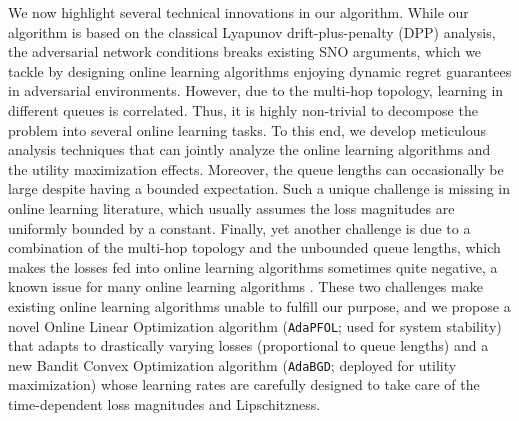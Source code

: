 \documentclass[11pt,fullpage,letterpaper]{article} %
\newcommand{\OLOAlg}{\texttt{AdaPFOL}\xspace}
\newcommand{\BCOAlg}{\texttt{AdaBGD}\xspace}
\begin{document}
We now highlight several technical innovations in our algorithm. While our algorithm is based on the classical Lyapunov drift-plus-penalty (DPP) analysis, the adversarial network conditions breaks existing SNO arguments, which we tackle by designing online learning algorithms enjoying dynamic regret guarantees in adversarial environments.
However, due to the multi-hop topology, learning in different queues is correlated. Thus, it is highly non-trivial to decompose the problem into several online learning tasks. To this end, we develop meticulous analysis techniques that can jointly analyze the online learning algorithms and the utility maximization effects.
Moreover, the queue lengths can occasionally be large despite having a bounded expectation. Such a unique challenge is missing in online learning literature, which usually assumes the loss magnitudes are uniformly bounded by a constant.
Finally, yet another challenge is due to a combination of the multi-hop topology and the unbounded queue lengths, which makes the losses fed into online learning algorithms sometimes quite negative, a known issue for many online learning algorithms \citep{zheng2019equipping,dai2023refined}.
These two challenges make existing online learning algorithms unable to fulfill our purpose, and we propose a novel {Online Linear Optimization} algorithm (\OLOAlg; used for system stability) that adapts to drastically varying losses (proportional to queue lengths) and a new {Bandit Convex Optimization} algorithm (\BCOAlg; deployed for utility maximization) whose learning rates are carefully designed to take care of the time-dependent loss magnitudes and Lipschitzness.
\end{document}
